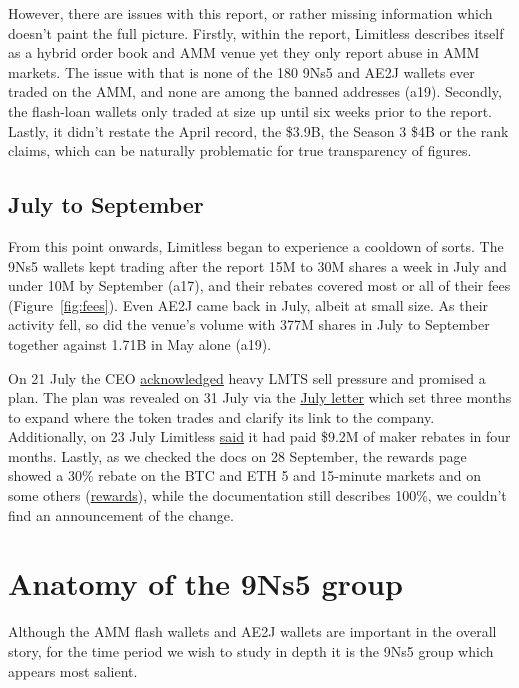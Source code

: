 \documentclass[11pt]{article}
\begin{document}
However, there are issues with this report, or rather missing information which doesn't paint the full picture.
Firstly, within the report, Limitless describes itself as a hybrid order book and AMM venue yet they only report abuse in AMM markets.
The issue with that is none of the 180 9Ns5 and AE2J wallets ever traded on the AMM, and none are among the banned addresses (a19).
Secondly, the flash-loan wallets only traded at size up until six weeks prior to the report.
Lastly, it didn't restate the April record, the \$3.9B, the Season 3 \$4B or the rank claims, which can be naturally problematic for true transparency of figures.

\subsection{July to September}

From this point onwards, Limitless began to experience a cooldown of sorts.
The 9Ns5 wallets kept trading after the report 15M to 30M shares a week in July and under 10M by September (a17), and their rebates covered most or all of their fees (Figure~\ref{fig:fees}).
Even AE2J came back in July, albeit at small size.
As their activity fell, so did the venue's volume with 377M shares in July to September together against 1.71B in May alone (a19).

On 21 July the CEO \href{https://x.com/cjhtech/status/2079392619705381219}{acknowledged} heavy LMTS sell pressure and promised a plan.
The plan was revealed on 31 July via the \href{https://limitless.exchange/blog/the-huddle-issue-02-july-31th}{July letter} which set three months to expand where the token trades and clarify its link to the company.
Additionally, on 23 July Limitless \href{https://x.com/trylimitless/status/2080314745077243985}{said} it had paid \$9.2M of maker rebates in four months.
Lastly, as we checked the docs on 28 September, the rewards page showed a 30\% rebate on the BTC and ETH 5 and 15-minute markets and on some others (\href{https://limitless.exchange/rewards?view=rebates}{rewards}), while the documentation still describes 100\%, we couldn't find an announcement of the change.

\section{Anatomy of the 9Ns5 group}

Although the AMM flash wallets and AE2J wallets are important in the overall story, for the time period we wish to study in depth it is the 9Ns5 group which appears most salient.
\end{document}
